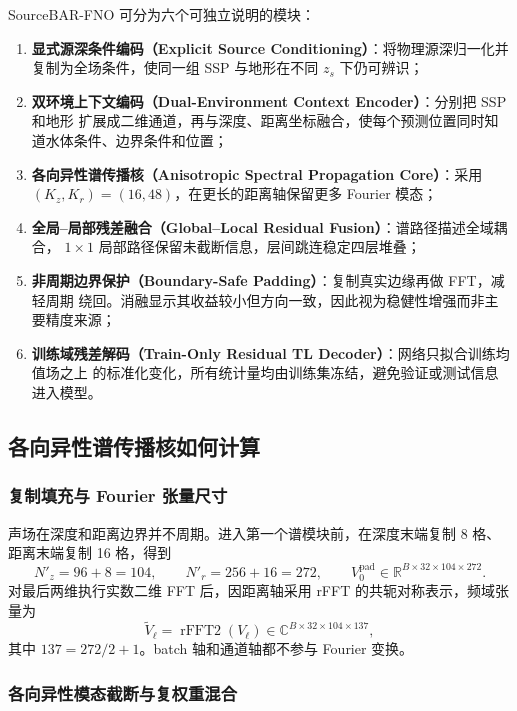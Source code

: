 \documentclass[UTF8,11pt]{ctexart}
\begin{document}
SourceBAR-FNO 可分为六个可独立说明的模块：
\begin{enumerate}
  \item \textbf{显式源深条件编码（Explicit Source Conditioning）}：将物理源深归一化并
  复制为全场条件，使同一组 SSP 与地形在不同 $z_s$ 下仍可辨识；
  \item \textbf{双环境上下文编码（Dual-Environment Context Encoder）}：分别把 SSP 和地形
  扩展成二维通道，再与深度、距离坐标融合，使每个预测位置同时知道水体条件、边界条件和位置；
  \item \textbf{各向异性谱传播核（Anisotropic Spectral Propagation Core）}：采用
  $(K_z,K_r)=(16,48)$，在更长的距离轴保留更多 Fourier 模态；
  \item \textbf{全局--局部残差融合（Global--Local Residual Fusion）}：谱路径描述全域耦合，
  $1\times1$ 局部路径保留未截断信息，层间跳连稳定四层堆叠；
  \item \textbf{非周期边界保护（Boundary-Safe Padding）}：复制真实边缘再做 FFT，减轻周期
  绕回。消融显示其收益较小但方向一致，因此视为稳健性增强而非主要精度来源；
  \item \textbf{训练域残差解码（Train-Only Residual TL Decoder）}：网络只拟合训练均值场之上
  的标准化变化，所有统计量均由训练集冻结，避免验证或测试信息进入模型。
\end{enumerate}

\subsection{各向异性谱传播核如何计算}

\subsubsection{复制填充与 Fourier 张量尺寸}

声场在深度和距离边界并不周期。进入第一个谱模块前，在深度末端复制 8 格、距离末端复制
16 格，得到
\begin{equation}
  N'_z=96+8=104,\qquad N'_r=256+16=272,\qquad
  V_0^{\mathrm{pad}}\in\mathbb{R}^{B\times32\times104\times272}.
\end{equation}
对最后两维执行实数二维 FFT 后，因距离轴采用 rFFT 的共轭对称表示，频域张量为
\begin{equation}
  \widetilde V_\ell=\operatorname{rFFT2}(V_\ell)
  \in\mathbb{C}^{B\times32\times104\times137},
\end{equation}
其中 $137=272/2+1$。batch 轴和通道轴都不参与 Fourier 变换。

\subsubsection{各向异性模态截断与复权重混合}
\end{document}
